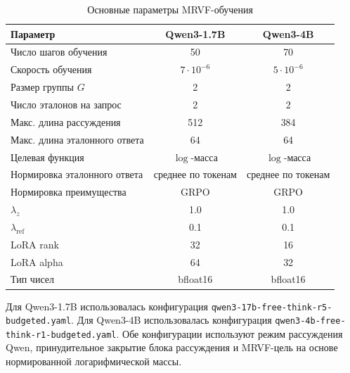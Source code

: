\begin{table}[h]
    \centering
    \caption{Основные параметры MRVF-обучения}
    \label{tab:mrvf-training-configs}
    \begin{tabular}{lcc}
        \hline
        Параметр                      & Qwen3-1.7B         & Qwen3-4B           \\
        \hline
        Число шагов обучения          & 50                 & 70                 \\
        Скорость обучения             & \(7\cdot 10^{-6}\) & \(5\cdot 10^{-6}\) \\
        Размер группы \(G\)           & 2                  & 2                  \\
        Число эталонов на запрос      & 2                  & 2                  \\
        Макс. длина рассуждения       & 512                & 384                \\
        Макс. длина эталонного ответа & 64                 & 64                 \\
        Целевая функция               & \(\log\)-масса     & \(\log\)-масса     \\
        Нормировка эталонного ответа  & среднее по токенам & среднее по токенам \\
        Нормировка преимущества       & GRPO               & GRPO               \\
        \(\lambda_z\)                 & 1.0                & 1.0                \\
        \(\lambda_{\mathrm{ref}}\)    & 0.1                & 0.1                \\
        LoRA rank                     & 32                 & 16                 \\
        LoRA alpha                    & 64                 & 32                 \\
        Тип чисел                     & bfloat16           & bfloat16           \\
        \hline
    \end{tabular}
\end{table}

Для Qwen3-1.7B использовалась конфигурация \texttt{qwen3-17b-free-think-r5-budgeted.yaml}. Для Qwen3-4B использовалась конфигурация \texttt{qwen3-4b-free-think-r1-budgeted.yaml}. Обе конфигурации используют режим рассуждения Qwen, принудительное закрытие блока рассуждения и MRVF-цель на основе нормированной логарифмической массы.

